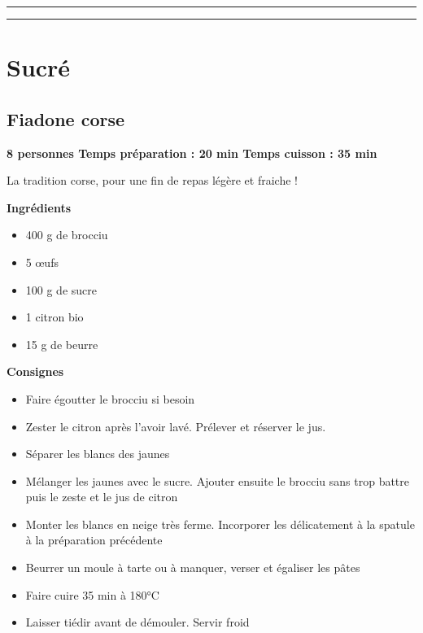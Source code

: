 \documentclass[]{book}
\providecommand{\tightlist}{%
  \setlength{\itemsep}{0pt}\setlength{\parskip}{0pt}}
\begin{document}
\begin{center}\rule{0.5\linewidth}{0.5pt}\end{center}

\begin{center}\rule{0.5\linewidth}{0.5pt}\end{center}

\section*{Sucré}\label{sucruxe9-2}

\subsection*{\texorpdfstring{{Fiadone
corse}}{Fiadone corse}}\label{fiadone-corse}

\begin{sucrebox}
\textbf{8 personnes \textbar{} Temps préparation : 20 min \textbar{}
Temps cuisson : 35 min}

La tradition corse, pour une fin de repas légère et fraiche !
\end{sucrebox}

 \textbf{Ingrédients}

\begin{itemize}
\tightlist
\item
  400 g de brocciu
\item
  5 œufs
\item
  100 g de sucre
\item
  1 citron bio
\item
  15 g de beurre
\end{itemize}

\textbf{Consignes}

\begin{itemize}
\tightlist
\item
  Faire égoutter le brocciu si besoin
\item
  Zester le citron après l'avoir lavé. Prélever et réserver le jus.
\item
  Séparer les blancs des jaunes
\item
  Mélanger les jaunes avec le sucre. Ajouter ensuite le brocciu sans
  trop battre puis le zeste et le jus de citron
\item
  Monter les blancs en neige très ferme. Incorporer les délicatement à
  la spatule à la préparation précédente
\item
  Beurrer un moule à tarte ou à manquer, verser et égaliser les pâtes
\item
  Faire cuire 35 min à 180°C
\item
  Laisser tiédir avant de démouler. Servir froid
\end{itemize}
\end{document}
